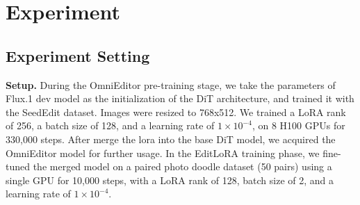 
\section{Experiment}

\subsection{Experiment Setting}
\noindent \textbf{Setup.}  During the OmniEditor pre-training stage, we take the parameters of Flux.1 dev model as the initialization of the DiT architecture, and trained it with the SeedEdit dataset. Images were resized to 768x512. We trained a LoRA rank of 256, a batch size of 128, and a learning rate of $1 \times 10^{-4}$, on 8 H100 GPUs for 330,000 steps. After merge the lora into the base DiT model, we acquired the OmniEditor model for further usage. In the EditLoRA training phase, we fine-tuned the merged model on a paired photo doodle dataset (50 pairs) using a single GPU for 10,000 steps, with a LoRA rank of 128, batch size of 2, and a learning rate of $1 \times 10^{-4}$.










